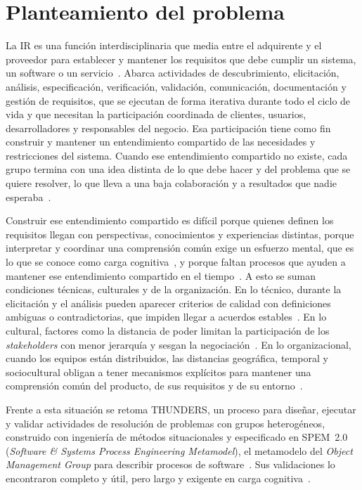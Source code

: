 \documentclass[12pt,letterpaper,oneside]{report}
\begin{document}
\section{Planteamiento del problema}
\label{sec:problema}
La IR es una función interdisciplinaria que media entre el adquirente y el
proveedor para establecer y mantener los requisitos que debe cumplir un sistema,
un software o un servicio~\cite{iso29148}. Abarca actividades de descubrimiento, elicitación, análisis, especificación,
verificación, validación, comunicación, documentación y gestión de requisitos, que se ejecutan
de forma iterativa durante todo el ciclo de vida y que necesitan la
participación coordinada de clientes, usuarios, desarrolladores y responsables
del negocio. Esa
participación tiene como fin construir y mantener un entendimiento compartido de
las necesidades y restricciones del sistema. Cuando ese entendimiento compartido no existe,
cada grupo termina con una idea distinta de lo que debe hacer y del problema que
se quiere resolver, lo que lleva a una baja colaboración y a resultados que
nadie esperaba~\cite{agredo2022thesis}.

Construir ese entendimiento compartido es difícil porque quienes definen los requisitos
llegan con perspectivas, conocimientos y experiencias distintas, porque
interpretar y coordinar una comprensión común exige un esfuerzo mental, que es
lo que se conoce como carga cognitiva~\cite{sweller1988}, y porque faltan
procesos que ayuden a mantener ese entendimiento compartido en el
tiempo~\cite{agredo2022thesis}. A esto se suman condiciones técnicas, culturales
y de la organización. En lo técnico, durante la elicitación y el análisis pueden aparecer criterios de
calidad con definiciones ambiguas o contradictorias, que impiden llegar a
acuerdos estables~\cite{mattmann2015quality}. En lo cultural, factores como la
distancia de poder limitan la participación de los \textit{stakeholders} con
menor jerarquía y sesgan la negociación~\cite{alsanoosy2019power}. En lo
organizacional, cuando los equipos están distribuidos, las distancias
geográfica, temporal y sociocultural obligan a tener mecanismos explícitos para
mantener una comprensión común del producto, de sus requisitos y de su
entorno~\cite{grande2024devops}.

Frente a esta situación se retoma THUNDERS, un proceso para diseñar, ejecutar y
validar actividades de resolución de problemas con grupos heterogéneos,
construido con ingeniería de métodos situacionales y especificado en SPEM~2.0
(\textit{Software \& Systems Process Engineering Metamodel}), el metamodelo del
\textit{Object Management Group} para describir procesos de
software~\cite{agredo2022thesis,omg2008spem}. Sus
validaciones lo encontraron completo y útil, pero largo y exigente en carga
cognitiva~\cite{agredo2022exploratory}.
\end{document}
